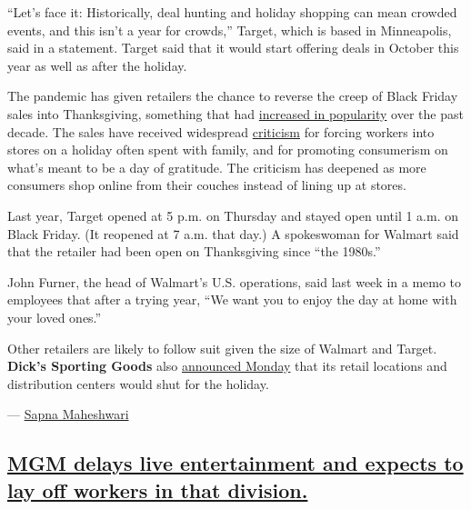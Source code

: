 ``Let's face it: Historically, deal hunting and holiday shopping can
mean crowded events, and this isn't a year for crowds,'' Target, which
is based in Minneapolis, said in a statement. Target said that it would
start offering deals in October this year as well as after the holiday.

The pandemic has given retailers the chance to reverse the creep of
Black Friday sales into Thanksgiving, something that had
\href{https://www.buzzfeednews.com/article/sapna/five-years-for-retailers-to-conquer-thanksgiving}{increased
in popularity} over the past decade. The sales have received widespread
\href{https://www.reuters.com/article/us-target-thanksgiving-protest/target-given-190000-black-friday-protest-signatures-idUSTRE7AK24S20111121\#GDqRY8xAbLObGsib.97}{criticism}
for forcing workers into stores on a holiday often spent with family,
and for promoting consumerism on what's meant to be a day of gratitude.
The criticism has deepened as more consumers shop online from their
couches instead of lining up at stores.

Last year, Target opened at 5 p.m. on Thursday and stayed open until 1
a.m. on Black Friday. (It reopened at 7 a.m. that day.) A spokeswoman
for Walmart said that the retailer had been open on Thanksgiving since
``the 1980s.''

John Furner, the head of Walmart's U.S. operations, said last week in a
memo to employees that after a trying year, ``We want you to enjoy the
day at home with your loved ones.''

Other retailers are likely to follow suit given the size of Walmart and
Target. \textbf{Dick's Sporting Goods} also
\href{http://investors.dicks.com/file/Index?KeyFile=404751770}{announced
Monday} that its retail locations and distribution centers would shut
for the holiday.

--- \href{https://www.nytimes.com/by/sapna-maheshwari}{Sapna Maheshwari}

\hypertarget{mgm-delays-live-entertainment-and-expects-to-lay-off-workers-in-that-division}{%
\subsection{\texorpdfstring{\protect\hyperlink{mgm-delays-live-entertainment-and-expects-to-lay-off-workers-in-that-division}{MGM
delays live entertainment and expects to lay off workers in that
division.}}{MGM delays live entertainment and expects to lay off workers in that division.}}\label{mgm-delays-live-entertainment-and-expects-to-lay-off-workers-in-that-division}}

